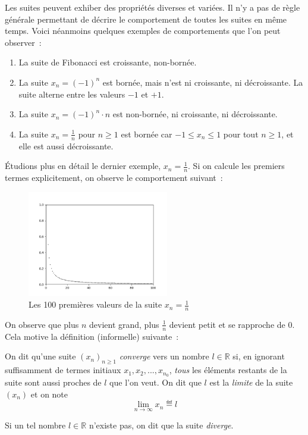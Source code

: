 Les suites peuvent exhiber des propriétés diverses et variées. Il n'y a pas de règle générale permettant de décrire le comportement de toutes les suites en même temps. Voici néanmoins quelques exemples de comportements que l'on peut observer~:

\begin{enumerate}
    \item La suite de Fibonacci est croissante, non-bornée.
    \item La suite $x_n = (-1)^n$ est bornée, mais n'est ni croissante, ni décroissante. La suite alterne entre les valeurs $-1$ et $+1$.
    \item La suite $x_n = (-1)^n \cdot n$ est non-bornée, ni croissante, ni décroissante.
    \item La suite $x_n = \frac{1}{n}$ pour $n \geq 1$ est bornée car $-1 \leq x_n \leq 1$ pour tout $n \geq 1$, et elle est aussi décroissante.
\end{enumerate}

Étudions plus en détail le dernier exemple, $x_n = \frac{1}{n}$. Si on calcule les premiers termes explicitement, on observe le comportement suivant~: 

\begin{figure}[H]
\centering \includegraphics[width = 0.55\textwidth]{./assets/imgs/1_sur_n.png}
\caption{Les 100 premières valeurs de la suite $x_n = \frac{1}{n}$}
\label{fig:1_sur_n}
\end{figure}

On observe que plus $n$ devient grand, plus $\frac{1}{n}$ devient petit et se rapproche de $0$. Cela motive la définition (informelle) suivante~:

\begin{boxdef}
On dit qu'une suite $(x_n)_{n \geq 1}$ \emph{converge} vers un nombre $l \in \mathbb R$ si, en ignorant suffisamment de termes initiaux $x_1, x_2, ..., x_{n_0}$, \emph{tous} les éléments restants de la suite sont aussi proches de $l$ que l'on veut. On dit que $l$ est la \emph{limite} de la suite $(x_n)$ et on note 
\[
\lim \limits_{n \to \infty} x_n \eqdef l
\]

Si un tel nombre $l \in \mathbb R$ n'existe pas, on dit que la suite \emph{diverge}.
\label{def:convergence}
\end{boxdef}

